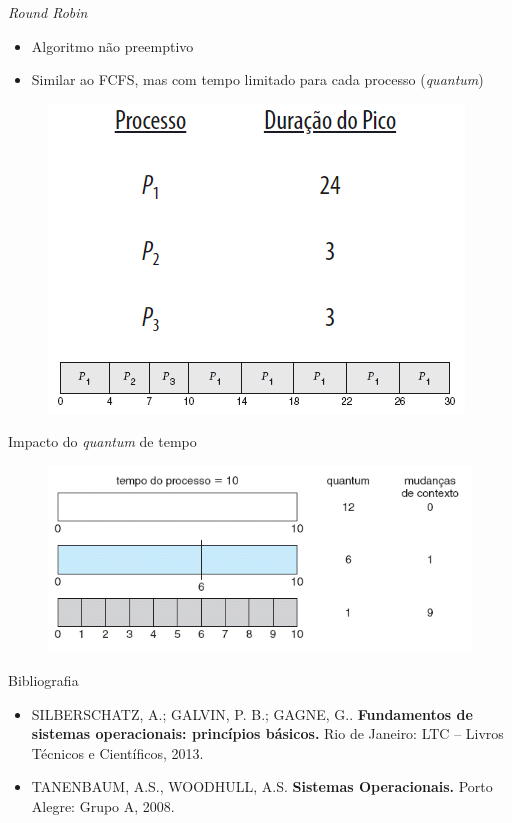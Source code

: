 \documentclass[aspectratio=169,
				xcolor=table]{beamer}
\begin{document}
	\begin{frame}{\textit{Round Robin}}
		\begin{itemize}
			\item Algoritmo não preemptivo 
			\vspace{1em}
			\item Similar ao FCFS, mas com tempo limitado para cada processo (\textit{quantum})	
						
		\end{itemize}
		\begin{figure}[hbtp]
		\centering
		\includegraphics[keepaspectratio, height=.6\textheight]{../figs/cap06/rr.png}
		\end{figure}			
	\end{frame}	
	
	\begin{frame}{Impacto do \textit{quantum} de tempo}
		\begin{figure}[hbtp]
		\centering
		\includegraphics[keepaspectratio, height=.6\textheight]{../figs/cap06/quantum.png}
		\end{figure}					
	\end{frame}	
	
	\begin{frame}{Bibliografia}
		\begin{itemize}
			\item SILBERSCHATZ, A.; GALVIN, P. B.; GAGNE, G.. \textbf{Fundamentos de sistemas operacionais: princípios básicos.} Rio de Janeiro: LTC – Livros Técnicos e Científicos, 2013.
			
			\vspace{1em}

			\item TANENBAUM, A.S., WOODHULL, A.S. \textbf{Sistemas Operacionais.} Porto Alegre: Grupo A, 2008.
			
		\end{itemize}
	\end{frame}


	\begin{frame}{}
	\end{frame}	
	
\end{document}
